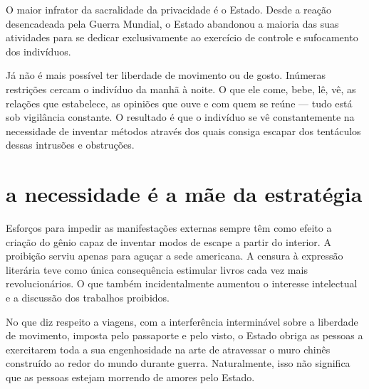 O maior infrator da sacralidade da privacidade é o Estado. Desde a\label{ref3}
reação desencadeada pela Guerra Mundial, o Estado abandonou a maioria
das suas atividades para se dedicar exclusivamente ao exercício de
controle e sufocamento dos indivíduos.

Já não é mais possível ter liberdade de movimento ou de gosto. Inúmeras
restrições cercam o indivíduo da manhã à noite. O que ele come, bebe,
lê, vê, as relações que estabelece, as opiniões que ouve e com quem
se reúne --- tudo está sob vigilância constante. O resultado é que o
indivíduo se vê constantemente na necessidade de inventar métodos
através dos quais consiga escapar dos tentáculos dessas intrusões e
obstruções.

\section{a necessidade é a mãe da estratégia}

Esforços para impedir as manifestações externas sempre têm como efeito a
criação do gênio capaz de inventar modos de escape a partir do interior.
A proibição serviu apenas para aguçar a sede americana. A censura à
expressão literária teve como única consequência estimular livros cada
vez mais revolucionários. O que também incidentalmente aumentou o
interesse intelectual e a discussão dos trabalhos proibidos.

No que diz respeito a viagens, com a interferência interminável sobre 
a liberdade de movimento, imposta pelo passaporte e pelo visto, o Estado obriga as
pessoas a exercitarem toda a sua engenhosidade na arte de atravessar o
muro chinês construído ao redor do mundo durante guerra. Naturalmente, isso não
significa que as pessoas estejam morrendo de amores pelo Estado.

